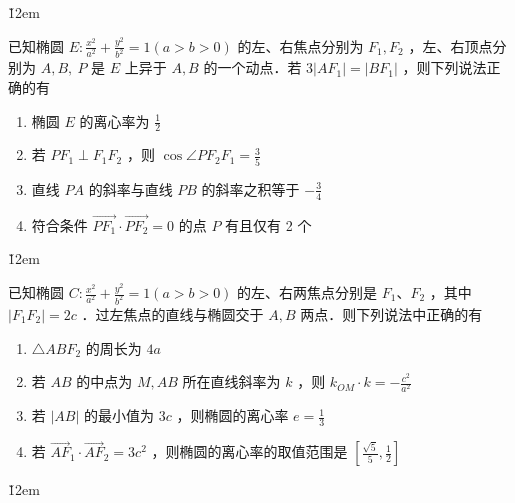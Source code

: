 \v{12em}

\begin{problem}
已知椭圆 $E: \frac{x^2}{a^2}+\frac{y^2}{b^2}=1(a>b>0)$ 的左、右焦点分别为 $F_1, F_2$ ，左、右顶点分别为 $A, B, ~ P$ 是 $E$ 上异于 $A, B$ 的一个动点．若 $3\left|A F_1\right|=\left|B F_1\right|$ ，则下列说法正确的有
\begin{enumerate}
    \item 椭圆 $E$ 的离心率为 $\frac{1}{2}$
    \item 若 $P F_1 \perp F_1 F_2$ ，则 $\cos \angle P F_2 F_1=\frac{3}{5}$
    \item 直线 $P A$ 的斜率与直线 $P B$ 的斜率之积等于 $-\frac{3}{4}$
    \item 符合条件 $\overrightarrow{P F_1} \cdot \overrightarrow{P F_2}=0$ 的点 $P$ 有且仅有 2 个
\end{enumerate}
\end{problem}

\v{12em}

\begin{problem}
已知椭圆 $C: \frac{x^2}{a^2}+\frac{y^2}{b^2}=1(a>b>0)$ 的左、右两焦点分别是 $F_1$、$F_2$ ，其中 $\left|F_1 F_2\right|=2 c$ ．过左焦点的直线与椭圆交于 $A, B$ 两点．则下列说法中正确的有
\begin{enumerate}
    \item $\triangle A B F_2$ 的周长为 $4 a$
    \item 若 $A B$ 的中点为 $M, A B$ 所在直线斜率为 $k$ ，则 $k_{O M} \cdot k=-\frac{c^2}{a^2}$
    \item 若 $|A B|$ 的最小值为 $3 c$ ，则椭圆的离心率 $e=\frac{1}{3}$
    \item 若 $\overrightarrow{A F}_1 \cdot \overrightarrow{A F}_2=3 c^2$ ，则椭圆的离心率的取值范围是 $\left[\frac{\sqrt{5}}{5}, \frac{1}{2}\right]$
\end{enumerate}
\end{problem}

\v{12em}
